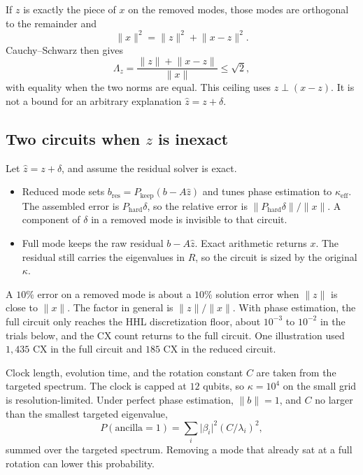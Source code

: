 \documentclass[11pt,a4paper]{article}
\begin{document}
If \(z\) is exactly the piece of \(x\) on the removed modes, those modes are orthogonal to the remainder and
\begin{equation}
  \lVert x\rVert^2=\lVert z\rVert^2+\lVert x-z\rVert^2.
  \label{eq:pythagoras}
\end{equation}
Cauchy--Schwarz then gives
\begin{equation}
  \Lambda_z=\frac{\lVert z\rVert+\lVert x-z\rVert}{\lVert x\rVert}\le\sqrt{2},
\end{equation}
with equality when the two norms are equal.
This ceiling uses \(z\perp(x-z)\).
It is not a bound for an arbitrary explanation \(\hat z=z+\delta\).

\subsection{Two circuits when \(z\) is inexact}
Let \(\hat z=z+\delta\), and assume the residual solver is exact.
\begin{itemize}
  \item Reduced mode sets \(b_{\mathrm{res}}=P_{\mathrm{keep}}(b-A\hat z)\) and tunes phase estimation to \(\kappa_{\mathrm{eff}}\).
  The assembled error is \(P_{\mathrm{hard}}\delta\), so the relative error is \(\lVert P_{\mathrm{hard}}\delta\rVert/\lVert x\rVert\).
  A component of \(\delta\) in a removed mode is invisible to that circuit.
  \item Full mode keeps the raw residual \(b-A\hat z\).
  Exact arithmetic returns \(x\).
  The residual still carries the eigenvalues in \(R\), so the circuit is sized by the original \(\kappa\).
\end{itemize}
A \(10\%\) error on a removed mode is about a \(10\%\) solution error when \(\lVert z\rVert\) is close to \(\lVert x\rVert\).
The factor in general is \(\lVert z\rVert/\lVert x\rVert\).
With phase estimation, the full circuit only reaches the HHL discretization floor, about \(10^{-3}\) to \(10^{-2}\) in the trials below, and the CX count returns to the full circuit.
One illustration used \(1{,}435\) CX in the full circuit and \(185\) CX in the reduced circuit.

Clock length, evolution time, and the rotation constant \(C\) are taken from the targeted spectrum.
The clock is capped at \(12\) qubits, so \(\kappa=10^{4}\) on the small grid is resolution-limited.
Under perfect phase estimation, \(\lVert b\rVert=1\), and \(C\) no larger than the smallest targeted eigenvalue,
\begin{equation}
  P(\text{ancilla}=1)=\sum_i\lvert\beta_i\rvert^2(C/\lambda_i)^2,
\end{equation}
summed over the targeted spectrum.
Removing a mode that already sat at a full rotation can lower this probability.
\end{document}
